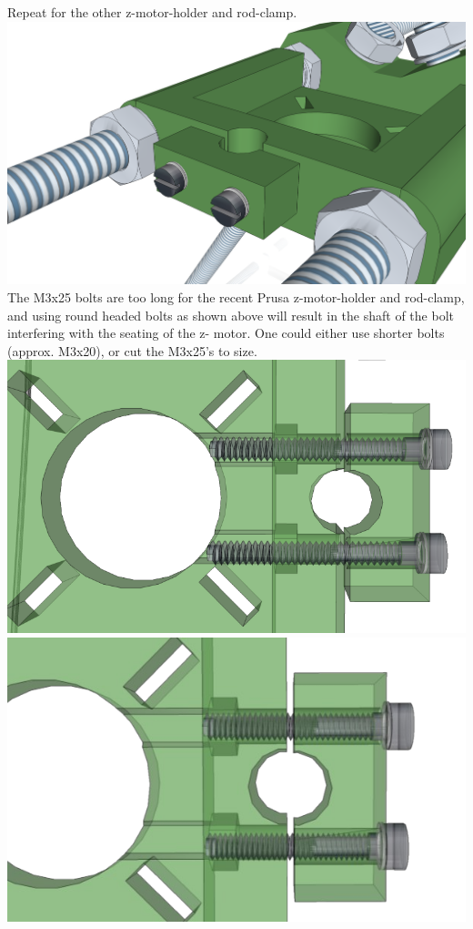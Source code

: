 \documentclass[twoside,openany,a4paper,titlepage]{memoir}
\begin{document}
	\section{}
	Repeat for the other z-motor-holder and rod-clamp.\\
	\includegraphics[width=1\linewidth]{graphics/ch8_5_1.png}
	The M3x25 bolts are too long for the recent Prusa z-motor-holder and rod-clamp, and using round
	headed bolts as shown above will result in the shaft of the bolt interfering with the seating of the z-
	motor. One could either use shorter bolts (approx. M3x20), or cut the M3x25's to size.\\
	\includegraphics[width=1\linewidth]{graphics/ch8_5_2.png}	
	\includegraphics[width=1\linewidth]{graphics/ch8_5_3.png}	
\end{document}
